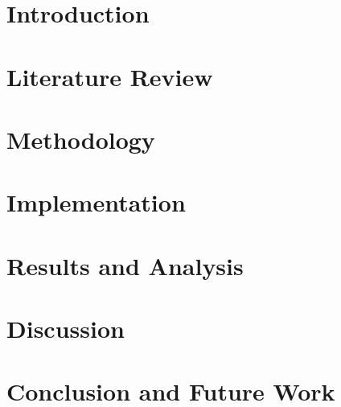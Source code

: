 \documentclass[12pt]{article}
\begin{document}


\newpage


\newpage


\newpage


\newpage


\newpage
\tableofcontents

\newpage
\listoffigures

\newpage
\listoftables

\newpage

\section{Introduction}


\section{Literature Review}


\section{Methodology}


\section{Implementation}


\section{Results and Analysis}


\section{Discussion}


\section{Conclusion and Future Work}


\newpage


\end{document}
